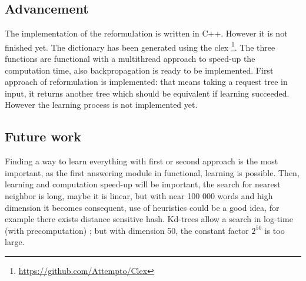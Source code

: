 \subsection{Advancement}

The implementation of the reformulation is written in C++. However it is not finished yet. The dictionary has been generated using the clex \footnote{\url{https://github.com/Attempto/Clex}}. The three functions are functional with a multithread approach to speed-up the computation time, also backpropagation is ready to be implemented.
First approach of reformulation is implemented: that means taking a request tree in input, it returns another tree which should be equivalent if learning succeeded. However the learning process is not implemented yet.

\subsection{Future work}

Finding a way to learn everything with first or second approach is the most important, as the first answering module in functional, learning is possible. Then, learning and computation speed-up will be important, the search for nearest neighbor is long, maybe it is linear, but with near 100 000 words and high dimension it becomes consequent, use of heuristics could be a good idea, for example there exists distance sensitive hash. Kd-trees allow a search in log-time (with precomputation) ; but with dimension 50, the constant factor $2^{50}$ is too large. 

